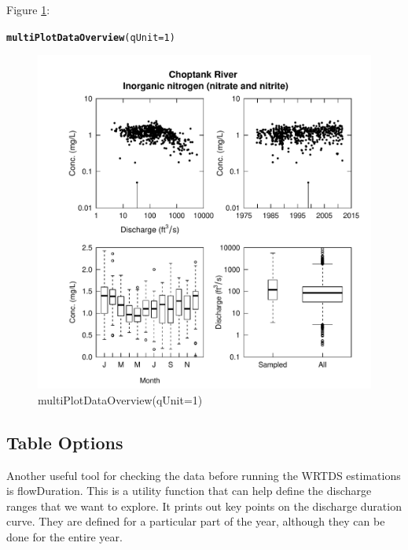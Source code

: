 \documentclass[a4paper,11pt]{article}\usepackage[]{graphicx}\usepackage[]{color}
\makeatletter
\newcommand{\hlnum}[1]{\textcolor[rgb]{0.686,0.059,0.569}{#1}}%
\newcommand{\hlstd}[1]{\textcolor[rgb]{0.345,0.345,0.345}{#1}}%
\newcommand{\hlkwc}[1]{\textcolor[rgb]{0.333,0.667,0.333}{#1}}%
\newcommand{\hlkwd}[1]{\textcolor[rgb]{0.737,0.353,0.396}{\textbf{#1}}}%
\newenvironment{kframe}{%
 \def\at@end@of@kframe{}%
 \ifinner\ifhmode%
  \def\at@end@of@kframe{\end{minipage}}%
  \begin{minipage}{\columnwidth}%
 \fi\fi%
 \def\FrameCommand##1{\hskip\@totalleftmargin \hskip-\fboxsep
 \colorbox{shadecolor}{##1}\hskip-\fboxsep
     \hskip-\linewidth \hskip-\@totalleftmargin \hskip\columnwidth}%
 \MakeFramed {\advance\hsize-\width
   \@totalleftmargin\z@ \linewidth\hsize
   \@setminipage}}%
 {\par\unskip\endMakeFramed%
 \at@end@of@kframe}
\newenvironment{knitrout}{}{} %
\makeatother
\begin{document}
Figure \ref{fig:multiPlotDataOverview}:
\begin{knitrout}
\color{fgcolor}\begin{kframe}
\begin{alltt}
\hlkwd{multiPlotDataOverview}\hlstd{(}\hlkwc{qUnit}\hlstd{=}\hlnum{1}\hlstd{)}
\end{alltt}
\end{kframe}\begin{figure}[]

\includegraphics[width=1\linewidth,height=1\linewidth]{figure/multiPlotDataOverview} \caption[multiPlotDataOverview(qUnit=1)]{multiPlotDataOverview(qUnit=1)\label{fig:multiPlotDataOverview}}
\end{figure}


\end{knitrout}


\FloatBarrier

\subsection{Table Options}
\label{sec:tableOptionsWQ}
Another useful tool for checking the data before running the WRTDS estimations is flowDuration. This is a utility function that can help define the discharge ranges that we want to explore.  It prints out key points on the discharge duration curve.  They are defined for a particular part of the year, although they can be done for the entire year.  
\end{document}
